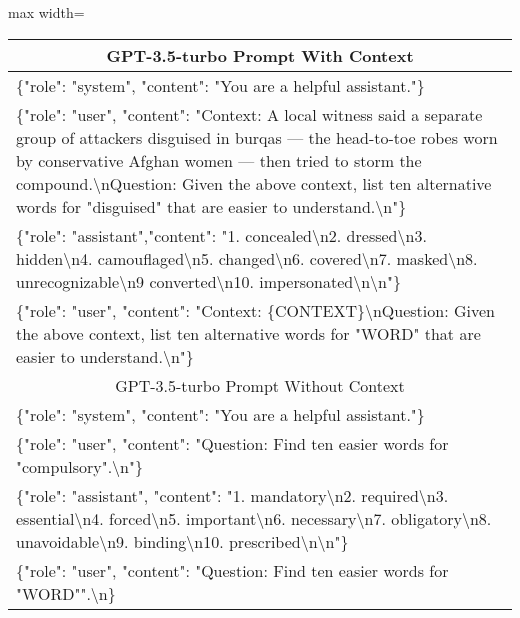 \documentclass[11pt]{article}
\newcommand{\ex}[1]{\textit{#1}\xspace}
\begin{document}
\begin{table*}[t]
\begin{center}
\begin{adjustbox}{max width=\textwidth}
\begin{tabular}{m{1.0\linewidth}}
\toprule
        \multicolumn{1}{c}{GPT-3.5-turbo Prompt With Context} 
        \\\midrule
        \{"role": "system", "content": "You are a helpful assistant."\}\\
        \{"role": "user", "content": "Context: A local witness said a separate group of attackers disguised in burqas — the head-to-toe robes worn by conservative Afghan women — then tried to storm the compound.\textbackslash nQuestion: Given the above context, list ten alternative words for "disguised" that are easier to understand.\textbackslash n"\}\\
        \{"role": "assistant","content": "1. concealed\textbackslash n2. dressed\textbackslash n3. hidden\textbackslash n4. camouflaged\textbackslash n5. changed\textbackslash n6. covered\textbackslash n7. masked\textbackslash n8. unrecognizable\textbackslash n9 converted\textbackslash n10. impersonated\textbackslash n\textbackslash n"\}\\
        \{"role": "user", "content": "Context: \{CONTEXT\}\textbackslash nQuestion: Given the above context, list ten alternative words for "{WORD}" that are easier to understand.\textbackslash n"\}\\\midrule
        \multicolumn{1}{c}{GPT-3.5-turbo Prompt Without Context} \\\midrule
        
        \{"role": "system", "content": "You are a helpful assistant."\}\\
        \{"role": "user", "content": "Question: Find ten easier words for "compulsory".\textbackslash n"\}\\
        \{"role": "assistant", "content": "1. mandatory\textbackslash n2. required\textbackslash n3. essential\textbackslash n4. forced\textbackslash n5. important\textbackslash n6. necessary\textbackslash n7. obligatory\textbackslash n8. unavoidable\textbackslash n9. binding\textbackslash n10. prescribed\textbackslash n\textbackslash n"\}\\
        \{"role": "user", "content": "Question: Find ten easier words for "{WORD}"".\textbackslash n\}
\\
\bottomrule
\end{tabular}
\end{adjustbox}
\caption{The prompt template for one-shot GPT-3.5-turbo in English with and without context. WORD and CONTEXT denote the target word $x$ and context $c_x$, respectively. We modified the template used in \citet{aumiller-gertz-2022-unihd} for the purpose of using \ex{gpt-3.5-turbo} instead of \ex{text-davinici-002}.}\label{prompt_template}
\end{center}
\end{table*}
\end{document}
